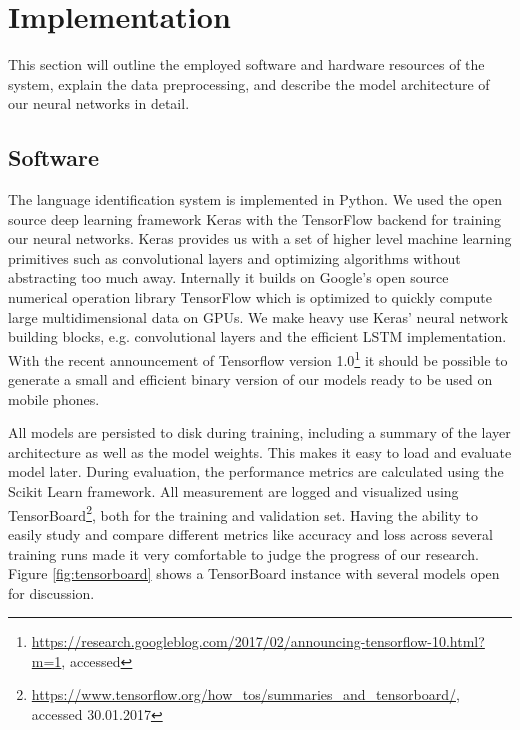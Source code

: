 \section{Implementation}
This section will outline the employed software and hardware resources of the system, explain the data preprocessing, and describe the model architecture of our neural networks in detail.

\subsection{Software}
\label{sec:software}

	The language identification system is implemented in Python. We used the open source deep learning framework Keras\cite{chollet2015keras} with the TensorFlow\cite{abadi2016tensorflow} backend for training our neural networks. Keras provides us with a set of higher level machine learning primitives such as convolutional layers and optimizing algorithms without abstracting too much away. Internally it builds on Google's open source numerical operation library TensorFlow which is optimized to quickly compute large multidimensional data on GPUs. We make heavy use Keras' neural network building blocks, e.g. convolutional layers and the efficient LSTM implementation. With the recent announcement of Tensorflow version 1.0\footnote{\url{https://research.googleblog.com/2017/02/announcing-tensorflow-10.html?m=1}, accessed} it should be possible to generate a small and efficient binary version of our models ready to be used on mobile phones.
	
	All models are persisted to disk during training, including a summary of the layer architecture as well as the model weights. This makes it easy to load and evaluate model later. During evaluation, the performance metrics are calculated using the Scikit Learn\cite{scikit-learn} framework. All measurement are logged and visualized using TensorBoard\footnote{\url{https://www.tensorflow.org/how_tos/summaries_and_tensorboard/}, accessed 30.01.2017}, both for the training and validation set. Having the ability to easily study and compare different metrics like accuracy and loss  across several training runs made it very comfortable to judge the progress of our research. Figure \ref{fig:tensorboard} shows a TensorBoard instance with several models open for discussion. 

